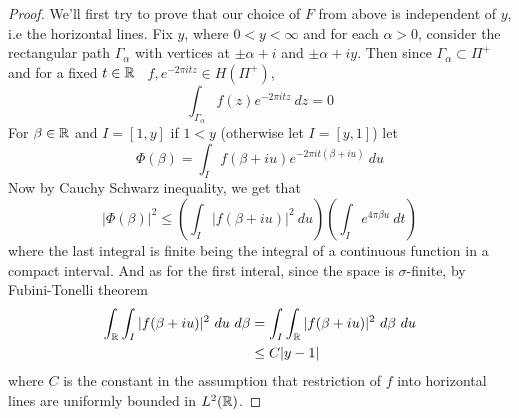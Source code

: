 \begin{proof}
  We'll first try to prove that our choice of $F$ from above is independent of $y$, i.e the horizontal lines.
  Fix $y$, where $0<y< \infty$ and for each $\alpha >0$, consider the rectangular path $\Gamma_\alpha$ with vertices at $\pm \alpha + i$ and $\pm \alpha + iy$. Then since $\Gamma_\alpha \subset \Pi^+$ and for a fixed $t \in \mathbb R$ \ $f, e^{-2\pi itz} \in H(\Pi^+)$, 
  \begin{equation}
    \label{eqn:eqn_holomorphic_stuff}
    \int_{\Gamma_\alpha} f(z)e^{-2\pi itz} \ dz = 0
  \end{equation}
  For $\beta \in \mathbb R$ and $I= [1, y]$ if $1<y$ (otherwise let $I=[y, 1]$) let $$\Phi(\beta) = \int_I f(\beta + iu)e^{-2\pi it(\beta+iu)} \ du$$
  Now by Cauchy Schwarz inequality, we get that
  \begin{equation}
    |\Phi(\beta)|^2 \le \left(\int_I |f(\beta+iu)|^2 \ du \right)\left(\int_I e^{4\pi \beta u} \ dt \right)
    \label{eqn:lets_see_abtthis_eqn}
  \end{equation}
  where the last integral is finite being the integral of a continuous function in a compact interval. And as for the first interal, since the space is $\sigma$-finite, by Fubini-Tonelli theorem
  \begin{align*}
    \int_\mathbb R \int_I |f(\beta + iu)|^2 \ du \ d\beta &= \int_I \int_\mathbb R |f(\beta + iu)|^2 \ d\beta \ du \\
    & \le C|y-1| 
  \end{align*}
  where $C$ is the constant in the assumption that restriction of $f$ into horizontal lines are uniformly bounded in $L^2(\mathbb R)$.


\end{proof}
